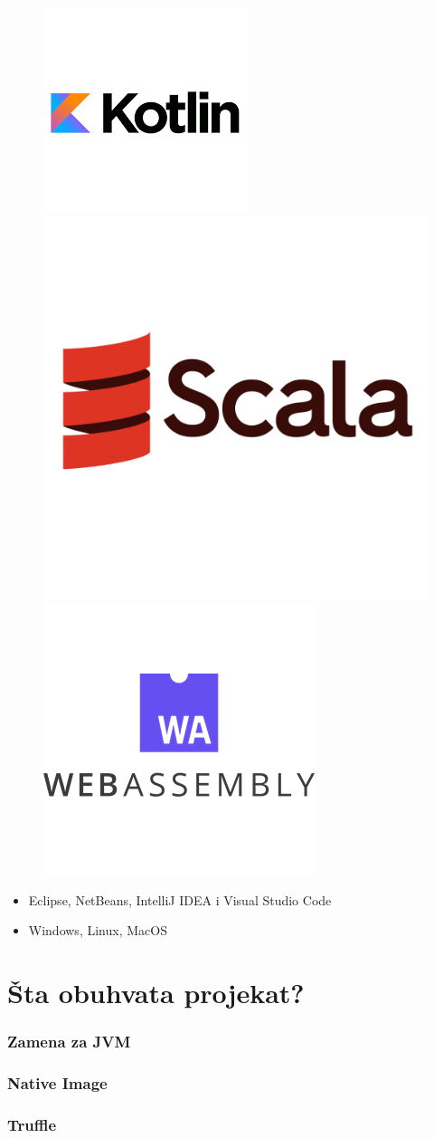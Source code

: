 \documentclass{beamer}
\begin{document}
\begin{frame}
\begin{figure}
			\includegraphics[width=0.16\linewidth]{imgs/kotlin_logo.png}
			\includegraphics[width=0.16\linewidth]{imgs/scala_logo.png}
			\includegraphics[width=0.16\linewidth]{imgs/wa_logo.png}
		\end{figure}
		
		\begin{flushleft}
			\begin{itemize}
				\item Eclipse, NetBeans, IntelliJ IDEA i Visual Studio Code
				\item Windows, Linux, MacOS
			\end{itemize}
		\end{flushleft}
		
	
	\end{frame}	
	

	\section{Šta obuhvata projekat?}
	
	\begin{frame}
		\frametitle{Zamena za JVM}
	\end{frame}	
	
	\begin{frame}
		\frametitle{Native Image}
	\end{frame}	
	
	
	\begin{frame}
		\frametitle{Truffle}
	\end{frame}	
\end{document}
